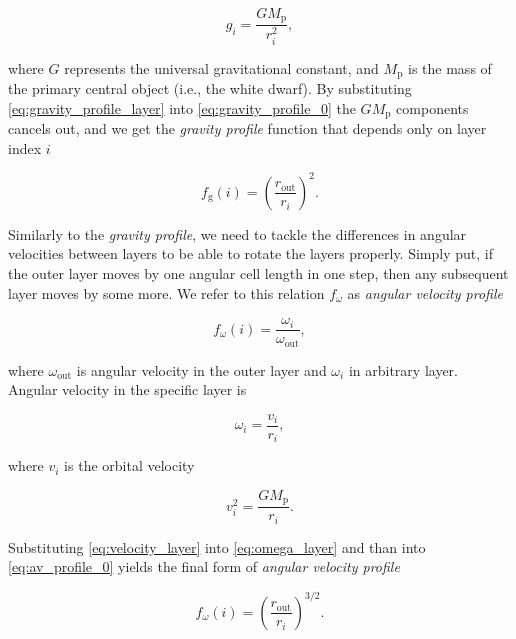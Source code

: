 \begin{equation}
    g_i = \frac{GM_{\text{p}}}{r_i^2},
    \label{eq:gravity_profile_layer}
\end{equation}

where $G$ represents the universal gravitational constant, and $M_{\mathrm{p}}$ is the mass of the primary central object (i.e., the white dwarf). By substituting \eqref{eq:gravity_profile_layer} into \eqref{eq:gravity_profile_0} the $GM_{\text{p}}$ components cancels out, and we get the \emph{gravity profile} function that depends only on layer index $i$

\begin{equation}
	f_{\text{g}}(i) = \left( \frac{r_{\text{out}}}{r_i} \right)^2.
	\label{eq:gravity_profile_final}
\end{equation}

Similarly to the \emph{gravity profile}, we need to tackle the differences in angular velocities between layers to be able to rotate the layers properly. Simply put, if the outer layer moves by one angular cell length in one step, then any subsequent layer moves by some more. We refer to this relation $f_{\omega}$ as \emph{angular velocity profile}

\begin{equation}
    f_{\omega}(i) = \frac{\omega_i}{\omega_\text{out}},
    \label{eq:av_profile_0}
\end{equation}

where $\omega_{\text{out}}$ is angular velocity in the outer layer and $\omega_i$ in arbitrary layer. Angular velocity in the specific layer is

\begin{equation}
    \omega_i = \frac{v_i}{r_i},
    \label{eq:omega_layer}
\end{equation}

where $v_i$ is the orbital velocity

\begin{equation}
    v_i^2 = \frac{G M_{\text{p}}}{r_i}.
    \label{eq:velocity_layer}
\end{equation}

Substituting \eqref{eq:velocity_layer} into \eqref{eq:omega_layer} and than into \eqref{eq:av_profile_0} yields the final form of \emph{angular velocity profile}

\begin{equation}
	f_{\omega}(i) = \left(\frac{r_{\text{out}}}{r_i}\right)^{3/2}.
\end{equation}

